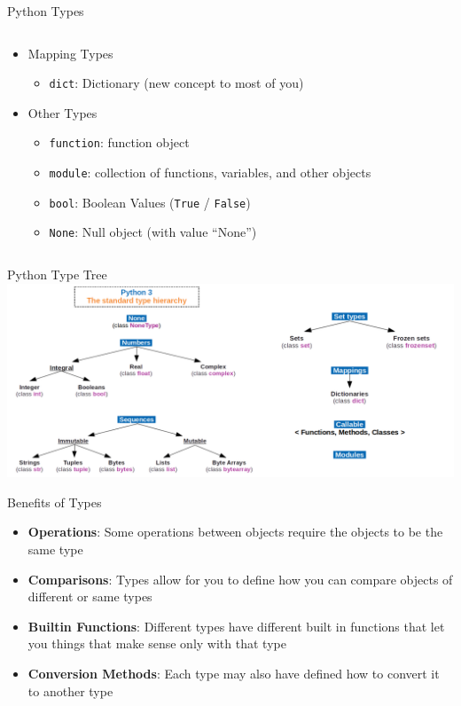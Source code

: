 \documentclass[aspectratio=169]{beamer}
\begin{document}
\begin{frame}{Python Types}
\begin{columns}
\begin{column}{0.5\textwidth}
\begin{itemize}
                \item Mapping Types
                      \begin{itemize}
                          \item \texttt{dict}: Dictionary (new concept to most of you)

                      \end{itemize}
                \item Other Types
                      \begin{itemize}
                          \item \texttt{function}: function object
                          \item \texttt{module}: collection of functions, variables, and other objects
                          \item \texttt{bool}: Boolean Values (\texttt{True} / \texttt{False})
                          \item \texttt{None}: Null object (with value ``None'')
                      \end{itemize}
            \end{itemize}
        \end{column}
    \end{columns}
\end{frame}

\begin{frame}{Python Type Tree}
    \centering
    \includegraphics[width=\textwidth]{imgs/type_tree.png}
\end{frame}

\begin{frame}{Benefits of Types}
    \begin{itemize}
        \item \textbf{Operations}: Some operations between objects require the objects to be the same type
        \item \textbf{Comparisons}: Types allow for you to define how you can compare objects of different or same types
        \item \textbf{Builtin Functions}: Different types have different built in functions that let you things that make sense only with that type
        \item \textbf{Conversion Methods}: Each type may also have defined how to convert it to another type
    \end{itemize}
\end{frame}
\end{document}
